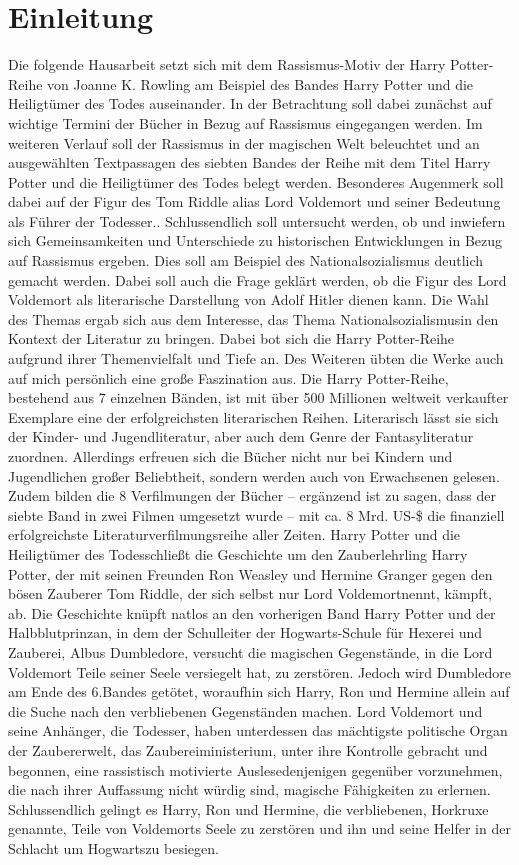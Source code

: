 \section{Einleitung} 
Die folgende Hausarbeit setzt sich mit dem Rassismus-Motiv der \glqq Harry Potter\grqq{}-Reihe von Joanne K. Rowling am Beispiel des Bandes \glqq Harry Potter und die Heiligtümer des Todes \grqq{} auseinander. In der Betrachtung soll dabei zunächst auf wichtige Termini der Bücher in Bezug auf Rassismus eingegangen werden. Im weiteren Verlauf soll der Rassismus in der magischen Welt beleuchtet und an ausgewählten Textpassagen des siebten Bandes der Reihe mit dem Titel \glqq Harry Potter und die Heiligtümer des Todes\grqq{} belegt werden. Besonderes Augenmerk soll dabei auf der Figur des Tom Riddle alias Lord Voldemort und seiner Bedeutung als Führer der Todesser..
Schlussendlich soll untersucht werden, ob und inwiefern sich Gemeinsamkeiten und Unterschiede zu historischen Entwicklungen in Bezug auf Rassismus ergeben. Dies soll am Beispiel des Nationalsozialismus deutlich gemacht werden. Dabei soll auch die Frage geklärt werden, ob die Figur des Lord Voldemort als  literarische Darstellung von Adolf Hitler dienen kann. Die Wahl des Themas ergab sich aus dem Interesse, das Thema \glqq Nationalsozialismus\grqq in den Kontext der Literatur zu bringen. Dabei bot sich die \glqq Harry Potter\grqq-Reihe aufgrund ihrer Themenvielfalt und Tiefe an. Des Weiteren übten die Werke auch auf mich persönlich eine große Faszination aus. 
Die \glqq Harry Potter\grqq-Reihe, bestehend aus 7 einzelnen Bänden, ist mit über 500 Millionen weltweit verkaufter Exemplare eine der erfolgreichsten literarischen Reihen. Literarisch lässt sie sich der Kinder- und Jugendliteratur, aber auch dem Genre der Fantasyliteratur zuordnen. Allerdings erfreuen sich die Bücher nicht nur bei Kindern und Jugendlichen großer Beliebtheit, sondern werden auch von Erwachsenen gelesen. Zudem bilden die 8 Verfilmungen der Bücher – ergänzend ist zu sagen, dass der siebte Band in zwei Filmen umgesetzt wurde – mit ca. 8 Mrd. US-\$ die finanziell erfolgreichste Literaturverfilmungsreihe aller Zeiten.
\glqq Harry Potter und die Heiligtümer des Todes\grqq schließt die Geschichte um den Zauberlehrling Harry Potter, der mit seinen Freunden Ron Weasley und Hermine Granger gegen den bösen Zauberer Tom Riddle, der sich selbst nur \glqq Lord Voldemort\grqq nennt, kämpft, ab. Die Geschichte knüpft natlos an den vorherigen Band \glqq Harry Potter und der Halbblutprinz\grqq an, in dem der Schulleiter der Hogwarts-Schule für Hexerei und Zauberei, Albus Dumbledore, versucht die magischen Gegenstände, in die Lord Voldemort Teile seiner Seele versiegelt hat, zu zerstören. Jedoch wird Dumbledore am Ende des 6.Bandes getötet, woraufhin sich Harry, Ron und Hermine allein auf die Suche nach den verbliebenen Gegenständen machen. Lord Voldemort und seine Anhänger, die Todesser, haben unterdessen das mächtigste politische Organ der Zaubererwelt, das Zaubereiministerium, unter ihre Kontrolle gebracht und begonnen, eine rassistisch motivierte \glqq Auslese\grqq denjenigen gegenüber vorzunehmen, die nach ihrer Auffassung nicht würdig sind, magische Fähigkeiten zu erlernen. 
Schlussendlich gelingt es Harry, Ron und Hermine, die verbliebenen, Horkruxe genannte, Teile von Voldemorts Seele zu zerstören und ihn und seine Helfer in der \glqq Schlacht um Hogwarts\grqq zu besiegen.
